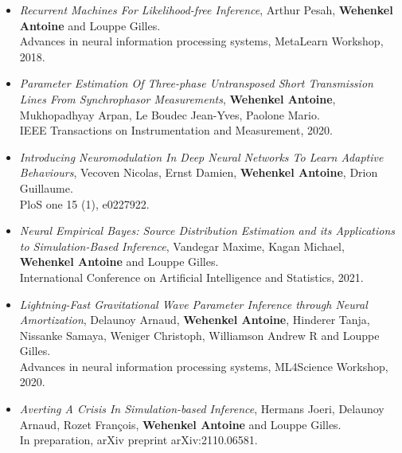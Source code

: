 \begin{tcolorbox}[breakable,width=\textwidth,title={Extra contributions}
    ,enhanced jigsaw, pad at break*=1mm, breakable,
    left=4mm, right=4mm, top=5mm, bottom=5mm,
    colback=LightBlue, boxrule=0pt, frame hidden,
    borderline ={0.5mm}{0mm}{Maroon}, arc=.5mm, coltitle=white, colbacktitle=Maroon]

\begin{itemize}
\item[] \citep{pesah2018recurrent} \textit{Recurrent Machines For Likelihood-free Inference},
Arthur Pesah, \textbf{Wehenkel Antoine} and Louppe Gilles.\\
Advances in neural information processing systems, MetaLearn Workshop, 2018.

\item[] \citep{wehenkel2020parameter} \textit{Parameter Estimation Of Three-phase Untransposed Short Transmission Lines From Synchrophasor Measurements},
\textbf{Wehenkel Antoine}, Mukhopadhyay Arpan, Le Boudec Jean-Yves, Paolone Mario.\\
IEEE Transactions on Instrumentation and Measurement, 2020.

\item[] \citep{vecoven2020introducing} \textit{Introducing Neuromodulation In Deep Neural Networks To Learn Adaptive Behaviours},
Vecoven Nicolas, Ernst Damien, \textbf{Wehenkel Antoine}, Drion Guillaume.\\
PloS one 15 (1), e0227922.

\item[] \citep{vandegar2021neural} \textit{Neural Empirical Bayes: Source Distribution Estimation and its Applications to Simulation-Based Inference},
Vandegar Maxime, Kagan Michael, \textbf{Wehenkel Antoine} and Louppe Gilles.\\
International Conference on Artificial Intelligence and Statistics, 2021.

\item[] \citep{delaunoy2020lightning} \textit{Lightning-Fast Gravitational Wave Parameter Inference through Neural Amortization},
Delaunoy Arnaud, \textbf{Wehenkel Antoine}, Hinderer Tanja, Nissanke Samaya, Weniger Christoph, Williamson Andrew R and Louppe Gilles.\\
Advances in neural information processing systems, ML4Science Workshop, 2020.

\item[] \citep{hermans2021averting} \textit{Averting A Crisis In Simulation-based Inference},
Hermans Joeri, Delaunoy Arnaud, Rozet Fran{\c{c}}ois, \textbf{Wehenkel Antoine} and Louppe Gilles.\\
In preparation, arXiv preprint arXiv:2110.06581.


\end{itemize}
\end{tcolorbox}
